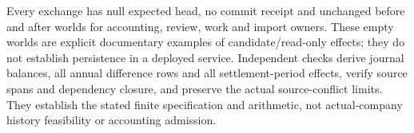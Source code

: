 Every exchange has null expected head, no commit receipt and unchanged before
and after worlds for accounting, review, work and import owners. These empty
worlds are explicit documentary examples of candidate/read-only effects;
they do not establish persistence in a deployed service. Independent checks
derive journal balances, all annual difference rows and all settlement-period
effects, verify source spans and dependency closure, and preserve the actual
source-conflict limits. They establish the stated finite specification and
arithmetic, not actual-company history feasibility or accounting admission.
